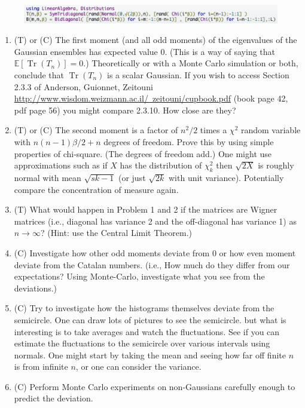 \documentclass{article}
\DeclareMathOperator{\Tr}{Tr}
\begin{document}
\begin{figure}[h]
    \centering
    \includegraphics[width=6in]{code1.png}
\end{figure}

\begin{enumerate}
    \item (T) or (C) The first moment (and all odd moments) of the eigenvalues of the Gaussian ensembles has expected value 0. (This is a way of saying that $\mathbb{E}[\Tr(T_n)]=0$.) Theoretically or with a Monte Carlo simulation or both, conclude that $\Tr(T_n)$ is a scalar Gaussian. If you wish to access  Section 2.3.3 of Anderson, Guionnet, Zeitouni  \href{http://www.wisdom.weizmann.ac.il/~zeitouni/cupbook.pdf}{http://www.wisdom.weizmann.ac.il/~zeitouni/cupbook.pdf} (book page 42, pdf page 56) you might compare 2.3.10. How close are they?
    \item (T) or (C) The second moment is a factor of $n^2/2$ times  a $\chi^2$ random variable with $n(n-1)\beta/2+n$ degrees of freedom. Prove this by using simple properties of chi-square. (The degrees of freedom add.) One might use approximations such as if $X$ has the distribution of $\chi_k^2$ then $\sqrt{2X}$ is roughly normal with mean $\sqrt{sk-1}$ (or just $\sqrt{2k}$ with unit variance). Potentially compare the concentration of measure again.
    \item (T) What would happen in Problem 1 and 2 if the matrices are Wigner matrices (i.e., diagonal has variance 2 and the off-diagonal has variance 1) as $n\to \infty$? (Hint: use the Central Limit Theorem.)
    \item (C) Investigate how other odd moments deviate from 0 or how even moment deviate from the Catalan numbers. (i.e., How much do they differ from our expectations? Using Monte-Carlo, investigate what you see from the deviations.)
    \item (C) Try to investigate how the histograms themselves deviate from the semicircle. One can draw lots of pictures to see the semicircle. but what is interesting is to take averages and watch the fluctuations. See if you can estimate the fluctuations to the semicircle over various intervals using normals. One might start by taking the mean and seeing how far off finite $n$ is from infinite $n$, or one can consider the variance.
    \item (C) Perform Monte Carlo experiments on non-Gaussians carefully enough to predict the deviation.
\end{enumerate}
\end{document}
